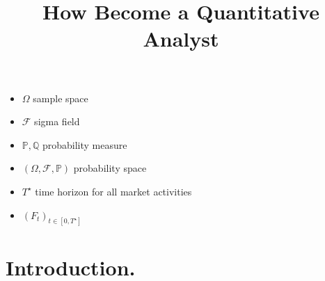 \documentclass{book}
\title{How Become a Quantitative Analyst}
\begin{document}
\maketitle
\tableofcontents
\newpage

\begin{itemize}
\item $\varOmega$ sample space
\item $\mathcal{F}$ sigma field 
\item $\mathbb{P},\mathbb{Q}$ probability measure
\item $(\varOmega,\mathcal{F},\mathbb{P})$ probability space
\item $T^{\star}$ time horizon for all market activities
\item $(F_{t})_{t\in [0,T^{\star}]}$
\end{itemize}
\chapter{Introduction.}
\end{document}
